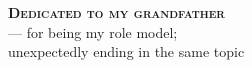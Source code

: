 
\thispagestyle{plain}

\vspace*{7cm}
\begin{flushright}
    \textbf{\Large \textsc{Dedicated to my grandfather}} \\[24pt]
        --- for being my role model;\\ unexpectedly ending in the same topic
\end{flushright}